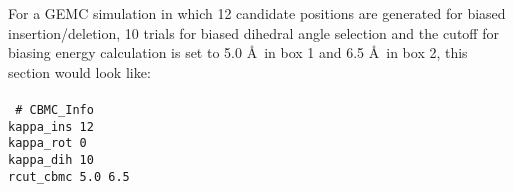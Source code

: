 {{{%
For a GEMC simulation in which 12 candidate positions are generated for biased insertion/deletion, 10 trials for
biased dihedral angle selection and the cutoff for biasing energy calculation is set to 5.0 \AA\ in box 1 and 6.5 \AA\
in box 2, this section would look like: \\ \\
%
\texttt{
\# CBMC\_Info \\
kappa\_ins   12 \\
kappa\_rot     0 \\
kappa\_dih   10 \\
rcut\_cbmc   5.0 6.5}
%
%
%
}}}
